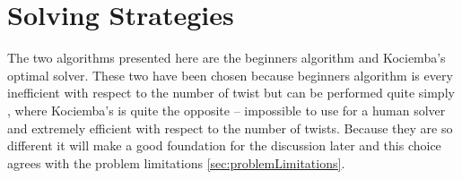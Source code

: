 \chapter{Solving Strategies}
The two algorithms presented here are the beginners algorithm and Kociemba's optimal solver.
These two have been chosen because beginners algorithm is every inefficient with respect to the number of twist but can be performed quite simply \cite{beginner}, where Kociemba's is quite the opposite -- impossible to use for a human solver and extremely efficient with respect to the number of twists.
Because they are so different it will make a good foundation for the discussion later and this choice agrees with the problem limitations \ref{sec:problemLimitations}.

	
	

